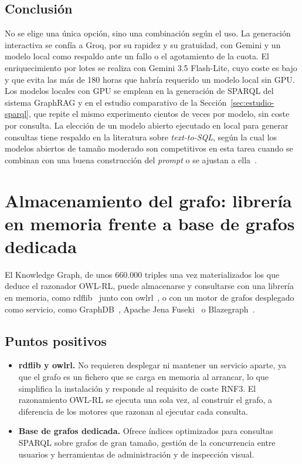 \documentclass[11pt, a4paper]{report}
\begin{document}
	\subsection{Conclusión}

	No se elige una única opción, sino una combinación según el uso. La generación
	interactiva se confía a Groq, por su rapidez y su gratuidad, con Gemini y un
	modelo local como respaldo ante un fallo o el agotamiento de la cuota. El
	enriquecimiento por lotes se realiza con Gemini 3.5 Flash-Lite, cuyo coste es
	bajo y que evita las más de 180 horas que habría requerido un modelo local
	sin GPU. Los modelos locales con GPU se emplean en la generación de SPARQL del
	sistema GraphRAG y en el estudio comparativo de la
	Sección~\ref{sec:estudio-sparql}, que repite el mismo experimento cientos de veces por modelo, sin coste
	por consulta. La elección de
	un modelo abierto ejecutado en local para generar consultas tiene respaldo en
	la literatura sobre \textit{text-to-SQL}, según la cual los modelos abiertos
	de tamaño moderado son competitivos en esta tarea cuando se combinan con
	una buena construcción del \textit{prompt} o se ajustan a
	ella~\cite{gao2024-dailsql,li2024-codes}.

	\section{Almacenamiento del grafo: librería en memoria frente a base de grafos dedicada}

	El Knowledge Graph, de unos 660.000 triples una vez materializados los que
	deduce el razonador OWL-RL, puede almacenarse y consultarse con una librería en memoria, como
	rdflib~\cite{rdflib} junto con
	owlrl~\cite{owlrl}, o con un motor de grafos
	desplegado como servicio, como
	GraphDB~\cite{graphdb}, Apache Jena
	Fuseki~\cite{jena-fuseki} o
	Blazegraph~\cite{blazegraph}.

	\subsection{Puntos positivos}

	\begin{itemize}
		\item \textbf{rdflib y owlrl.} No requieren desplegar ni mantener un servicio aparte, ya que el grafo es un fichero que se carga en memoria al
		arrancar, lo que simplifica la instalación y responde al requisito de
		coste RNF3. El razonamiento OWL-RL se ejecuta una sola vez, al construir
		el grafo, a diferencia de los motores que razonan al ejecutar cada
		consulta.
		\item \textbf{Base de grafos dedicada.} Ofrece índices optimizados para
		consultas SPARQL sobre grafos de gran tamaño, gestión de la concurrencia
		entre usuarios y herramientas de administración y de inspección visual.
	\end{itemize}
\end{document}
